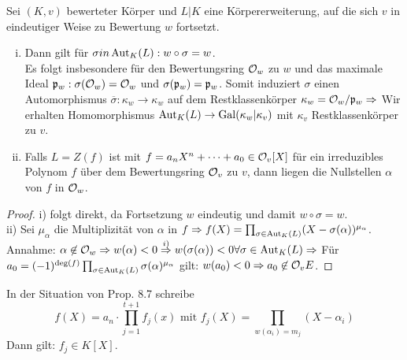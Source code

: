 \begin{Bem}
Sei $(K,v)$ bewerteter Körper und $L|K$ eine Körpererweiterung, auf die sich $v$ in eindeutiger Weise zu Bewertung $w$ fortsetzt.
\begin{enumerate}[i)]
\item Dann gilt für $\sigma in \operatorname{Aut}_K(L): w \circ \sigma = w$.\\
Es folgt insbesondere für den Bewertungsring $\mathcal{O}_w$ zu $w$ und das maximale Ideal $\mathfrak{p}_w: \sigma(\mathcal{O}_w)=\mathcal{O}_w$ und $\sigma(\mathfrak{p}_w)=\mathfrak{p}_w$. Somit induziert $\sigma$ einen Automorphismus $\overline{\sigma}: \kappa_w \to \kappa_w$ auf dem Restklassenkörper $\kappa_w=\mathcal{O}_w/\mathfrak{p}_w \Rightarrow$ Wir erhalten Homomorphismus $\operatorname{Aut}_K(L) \to \operatorname{Gal}(\kappa_w|\kappa_v)$ mit $\kappa_v$ Restklassenkörper zu $v$.
\item Falls $L=Z(f)$ ist mit $f=a_nX^n+\dots+a_0 \in \mathcal{O}_v[X]$ für ein irreduzibles Polynom $f$ über dem Bewertungsring $\mathcal{O}_v$ zu $v$, dann liegen die Nullstellen $\alpha$ von $f$ in $\mathcal{O}_w$.
\end{enumerate}
\end{Bem}

\begin{proof}
i) folgt direkt, da Fortsetzung $w$ eindeutig und damit $w \circ \sigma = w$.\\
ii) Sei $\mu_\alpha$ die Multiplizität von $\alpha$ in $f \Rightarrow f(X)= \prod_{\sigma \in \operatorname{Aut}_K(L)} (X-\sigma(\alpha))^{\mu_\alpha}$.\\
Annahme: $\alpha \not \in \mathcal{O}_w \Rightarrow w(\alpha)<0 \stackrel{i)}{\Rightarrow} w(\sigma(\alpha))<0 \forall \sigma \in \operatorname{Aut}_K(L) \Rightarrow$ Für $a_0=(-1)^{\deg(f)} \prod_{\sigma \in \operatorname{Aut}_K(L)} \sigma(\alpha)^{\mu_\alpha}$ gilt: $w(a_0)<0 \Rightarrow a_0 \not \in \O_v \Lightning$.
\end{proof}

\begin{Prop}
In der Situation von Prop. 8.7 schreibe
\[ f(X)=a_n \cdot \prod_{j=1}^{t+1} f_j(x) \text{ mit } f_j(X)= \prod_{w(\alpha_i)=m_j} (X-\alpha_i)\]
Dann gilt: $f_j \in K[X]$.
\end{Prop}

